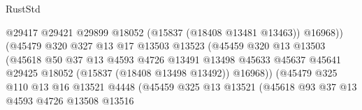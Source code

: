 \begin{lexlean}{RustStd}
\begin{coremodule}
                                            @29417
                                            @29421
                                            @29899
                                            @18052
                                            (@15837 (@18408 @13481 @13463))
                                            @16968))
                                        (@45479
                                          @320
                                          @327
                                          @13
                                          @17
                                          @13503
                                          @13523
                                          (@45459
                                            @320
                                            @13
                                            @13503
                                            (@45618
                                              @50
                                              @37
                                              @13
                                              @4593
                                              @4726
                                              @13491
                                              @13498
                                              @45633
                                              @45637
                                              @45641
                                              @29425
                                              @18052
                                              (@15837 (@18408 @13498 @13492))
                                              @16968))
                                          (@45479
                                            @325
                                            @110
                                            @13
                                            @16
                                            @13521
                                            @4448
                                            (@45459
                                              @325
                                              @13
                                              @13521
                                              (@45618
                                                @93
                                                @37
                                                @13
                                                @4593
                                                @4726
                                                @13508
                                                @13516

\end{coremodule}
\end{lexlean}
